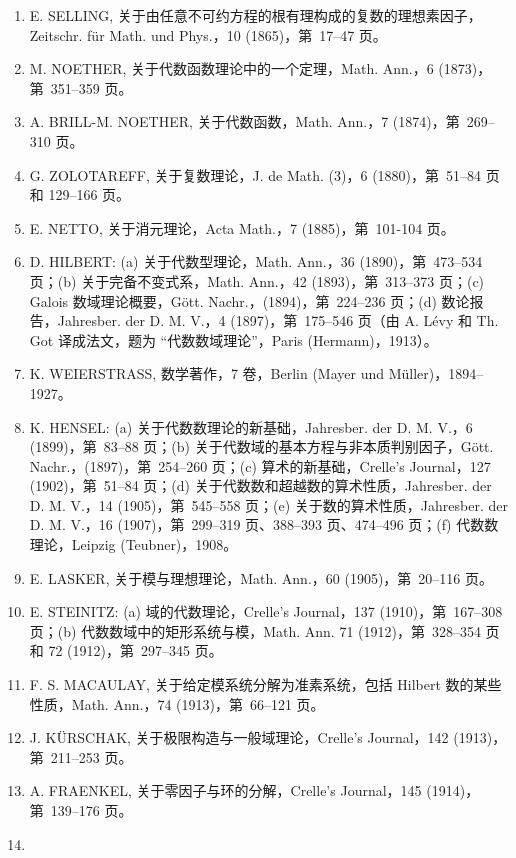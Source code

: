 \begin{enumerate}
\def\labelenumi{\arabic{enumi}.}
\setcounter{enumi}{10}
\item
  E. SELLING, 关于由任意不可约方程的根有理构成的复数的理想素因子，Zeitschr. für Math. und Phys.，10 (1865)，第~17--47 页。
\item
  M. NOETHER, 关于代数函数理论中的一个定理，Math. Ann.，6 (1873)，第~351--359 页。
\item
  A. BRILL-M. NOETHER, 关于代数函数，Math. Ann.，7 (1874)，第~269--310 页。
\item
  G. ZOLOTAREFF, 关于复数理论，J. de Math. (3)，6 (1880)，第~51--84 页和 129--166 页。
\item
  E. NETTO, 关于消元理论，Acta Math.，7 (1885)，第~101-104 页。
\item
  D. HILBERT: (a) 关于代数型理论，Math. Ann.，36 (1890)，第~473--534 页；(b) 关于完备不变式系，Math. Ann.，42 (1893)，第~313--373 页；(c) Galois 数域理论概要，Gött. Nachr.，(1894)，第~224--236 页；(d) 数论报告，Jahresber. der D. M. V.，4 (1897)，第~175--546 页（由 A. Lévy 和 Th. Got 译成法文，题为 ``代数数域理论''，Paris (Hermann)，1913）。
\item
  K. WEIERSTRASS, 数学著作，7 卷，Berlin (Mayer und Müller)，1894--1927。
\item
  K. HENSEL: (a) 关于代数数理论的新基础，Jahresber. der D. M. V.，6 (1899)，第~83--88 页；(b) 关于代数域的基本方程与非本质判别因子，Gött. Nachr.，(1897)，第~254--260 页；(c) 算术的新基础，Crelle's Journal，127 (1902)，第~51--84 页；(d) 关于代数数和超越数的算术性质，Jahresber. der D. M. V.，14 (1905)，第~545--558 页；(e) 关于数的算术性质，Jahresber. der D. M. V.，16 (1907)，第~299--319 页、388--393 页、474--496 页；(f) 代数数理论，Leipzig (Teubner)，1908。
\item
  E. LASKER, 关于模与理想理论，Math. Ann.，60 (1905)，第~20--116 页。
\item
  E. STEINITZ: (a) 域的代数理论，Crelle's Journal，137 (1910)，第~167--308 页；(b) 代数数域中的矩形系统与模，Math. Ann. 71 (1912)，第~328--354 页和 72 (1912)，第~297--345 页。
\item
  F. S. MACAULAY, 关于给定模系统分解为准素系统，包括 Hilbert 数的某些性质，Math. Ann.，74 (1913)，第~66--121 页。
\item
  J. KÜRSCHAK, 关于极限构造与一般域理论，Crelle's Journal，142 (1913)，第~211--253 页。
\item
  A. FRAENKEL, 关于零因子与环的分解，Crelle's Journal，145 (1914)，第~139--176 页。
\item

\end{enumerate}
